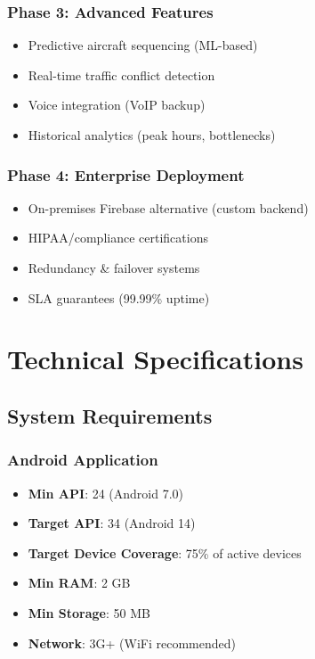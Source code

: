 \documentclass[11pt,a4paper]{report}
\begin{document}
\subsection{Phase 3: Advanced Features}

\begin{itemize}
    \item Predictive aircraft sequencing (ML-based)
    \item Real-time traffic conflict detection
    \item Voice integration (VoIP backup)
    \item Historical analytics (peak hours, bottlenecks)
\end{itemize}

\subsection{Phase 4: Enterprise Deployment}

\begin{itemize}
    \item On-premises Firebase alternative (custom backend)
    \item HIPAA/compliance certifications
    \item Redundancy \& failover systems
    \item SLA guarantees (99.99\% uptime)
\end{itemize}

\chapter{Technical Specifications}

\section{System Requirements}

\subsection{Android Application}

\begin{itemize}
    \item \textbf{Min API}: 24 (Android 7.0)
    \item \textbf{Target API}: 34 (Android 14)
    \item \textbf{Target Device Coverage}: 75\% of active devices
    \item \textbf{Min RAM}: 2 GB
    \item \textbf{Min Storage}: 50 MB
    \item \textbf{Network}: 3G+ (WiFi recommended)
\end{itemize}
\end{document}
